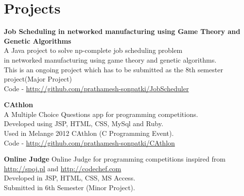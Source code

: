 \documentclass[11pt,a4paper]{moderncv}
\begin{document}

          




\section{Projects}

\cvlistitem
{\textbf
        {
         Job Scheduling in networked manufacturing using Game Theory
         and Genetic Algorithms
        }   
      \\A Java project to solve np-complete job scheduling problem \\
      in networked manufacturing using game theory and genetic algorithms.\\
      This is an ongoing project which has to be submitted as the 8th
      semester project(Major Project) \\
      Code - \url{http://github.com/prathamesh-sonpatki/JobScheduler}
}

\cvlistitem
{\textbf
      {CAthlon}  
      \\A Multiple Choice Questions app for programming competitions.\\
      Developed using JSP, HTML, CSS, MySql and Ruby.\\
      Used in Melange 2012 CAthlon (C Programming Event). \\
      Code - \url{http://github.com/prathamesh-sonpatki/CAthlon}
}


\cvlistitem
{\textbf{Online Judge} 
    Online Judge for programming competitions inspired from \url{http://spoj.pl} 
    and \url{http://codechef.com}\\
    Developed in JSP, HTML, CSS, MS Access. \\
    Submitted in 6th Semester (Minor Project). 
}




\end{document}
